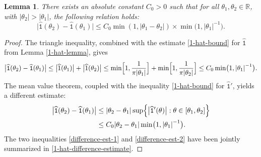 \documentclass[12pt, twoside]{article}
\newtheorem{lemma}[theorem]{Lemma}
\theoremstyle{definition}
\numberwithin{equation}{section}
\begin{document}
\begin{lemma} \label{1-hat-difference-lemma}
There exists an absolute constant $C_0 > 0$ such that for all $\theta_1, \theta_2 \in \mathbb R$, with $|\theta_2| > |\theta_1|$, the following relation holds:  
\begin{equation} 
\bigl| \widehat{\mathtt 1}(\theta_2) - \widehat{\mathtt 1}(\theta_1) \bigr| \leq C_0 \min(1, |\theta_1 - \theta_2|) \times \min \bigl(1, {|\theta_1|}^{-1}\bigr).  \label{1-hat-difference-estimate}
\end{equation}   
\end{lemma} 
\begin{proof} 
The triangle inequality, combined with the estimate \eqref{1-hat-bound} for $\widehat{\mathtt 1}$ from Lemma \ref{1-hat-lemma}, gives 
\begin{equation} 
\bigl| \widehat{\mathtt 1}(\theta_2) - \widehat{\mathtt 1}(\theta_1) \bigr| \leq \bigl| \widehat{1}(\theta_1) \bigr| + \bigl| \widehat{1}(\theta_2)\bigr| \leq \min \Bigl[1, \frac{1}{\pi |\theta_1|}\Bigr] + \min \Bigl[1, \frac{1}{\pi |\theta_2|}\Bigr] \leq C_0 \min\bigl(1, {|\theta_1|}^{-1} \bigr). \label{difference-est-1}
\end{equation}  
The mean value theorem, coupled with the inequality \eqref{1-hat-bound} for $\widehat{\mathtt 1}'$, yields a different estimate: 
\begin{align} 
\bigl| \widehat{\mathtt 1}(\theta_2) - \widehat{\mathtt 1}(\theta_1) \bigr| &\leq |\theta_2 - \theta_1| \sup \Bigl\{\bigl| \widehat{\mathtt 1}'(\theta)\bigr| : \theta \in [\theta_1, \theta_2] \Bigr\} \nonumber \\ 
&\leq C_0 |\theta_2-\theta_1| \min\bigl(1, {|\theta_1|}^{-1}\bigr). 
\label{difference-est-2}
\end{align}  
The two inequalities \eqref{difference-est-1} and \eqref{difference-est-2} have been jointly summarized in \eqref{1-hat-difference-estimate}. 
\end{proof} 
\end{document}
